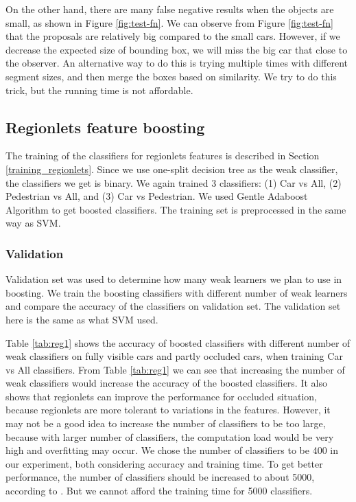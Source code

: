 \documentclass{article} %
\begin{document}
On the other hand, there are many false negative results when the objects are small, as shown in Figure \ref{fig:test-fn}. We can observe from Figure \ref{fig:test-fn} that the proposals are relatively big compared to the small cars. However, if we decrease the expected size of bounding box, we will miss the big car that close to the observer. An alternative way to do this is trying multiple times with different segment sizes, and then merge the boxes based on similarity. We try to do this trick, but the running time is not affordable. 

\subsection{Regionlets feature boosting}


The training of the classifiers for regionlets features is described in Section \ref{training_regionlets}. Since we use one-split decision tree as the weak classifier, the classifiers we get is binary. We again trained 3 classifiers: (1) Car vs All, (2) Pedestrian vs All, and (3) Car vs Pedestrian. We used Gentle Adaboost Algorithm \cite{Torralba04sharingfeatures:} to get boosted classifiers. The training set is preprocessed in the same way as SVM. 

\subsubsection{Validation}
Validation set was used to determine how many weak learners we plan to use in boosting. We train the boosting classifiers with different number of weak learners and compare the accuracy of the classifiers on validation set. The validation set here is the same as what SVM used. 

Table \ref{tab:reg1} shows the accuracy of boosted classifiers with different number of weak classifiers on fully visible cars and partly occluded cars, when training Car vs All classifiers. From Table \ref{tab:reg1} we can see that increasing the number of weak classifiers would increase the accuracy of the boosted classifiers. It also shows that regionlets can improve the performance for occluded situation, because regionlets are more tolerant to variations in the features. However, it may not be a good idea to increase the number of classifiers to be too large, because with larger number of classifiers, the computation load would be very high and overfitting may occur. We chose the number of classifiers to be 400 in our experiment, both considering accuracy and training time. To get better performance, the number of classifiers should be increased to about 5000, according to \cite{Wang2013}. But we cannot afford the training time for 5000 classifiers.
\end{document}
